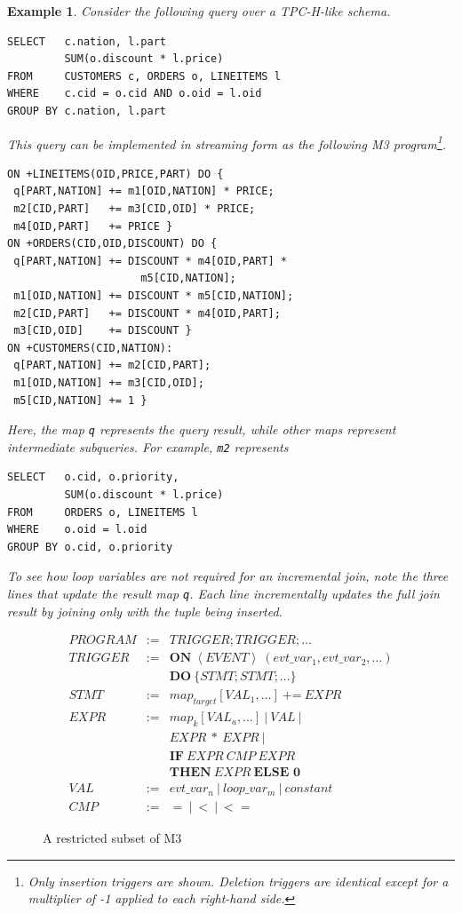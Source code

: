 \documentclass{vldb}
\newtheorem{example}[theorem]{Example}
\begin{document}
\begin{example}
Consider the following query over a TPC-H-like schema.
\begin{verbatim}
SELECT   c.nation, l.part
         SUM(o.discount * l.price)
FROM     CUSTOMERS c, ORDERS o, LINEITEMS l
WHERE    c.cid = o.cid AND o.oid = l.oid
GROUP BY c.nation, l.part
\end{verbatim}

This query can be implemented in streaming form as the following M3 program\footnote{Only insertion triggers are shown.  Deletion triggers are identical except for a multiplier of -1 applied to each right-hand side.}.
\begin{verbatim}
ON +LINEITEMS(OID,PRICE,PART) DO {
 q[PART,NATION] += m1[OID,NATION] * PRICE;
 m2[CID,PART]   += m3[CID,OID] * PRICE;
 m4[OID,PART]   += PRICE }
ON +ORDERS(CID,OID,DISCOUNT) DO {
 q[PART,NATION] += DISCOUNT * m4[OID,PART] * 
                     m5[CID,NATION];
 m1[OID,NATION] += DISCOUNT * m5[CID,NATION];
 m2[CID,PART]   += DISCOUNT * m4[OID,PART];
 m3[CID,OID]    += DISCOUNT }
ON +CUSTOMERS(CID,NATION): 
 q[PART,NATION] += m2[CID,PART];
 m1[OID,NATION] += m3[CID,OID];
 m5[CID,NATION] += 1 }
\end{verbatim}
Here, the map \texttt{q} represents the query result, while other maps represent intermediate subqueries.  For example, \texttt{m2} represents 
\begin{verbatim}
SELECT   o.cid, o.priority, 
         SUM(o.discount * l.price) 
FROM     ORDERS o, LINEITEMS l
WHERE    o.oid = l.oid
GROUP BY o.cid, o.priority
\end{verbatim}
To see how loop variables are not required for an incremental join, note the three lines that update the result map \texttt{q}.  Each line incrementally updates the full join result by joining only with the tuple being inserted.
\end{example}

\begin{figure}
\begin{center}
{\small
\begin{eqnarray*}
PROGRAM & := & TRIGGER; TRIGGER; \ldots\\
TRIGGER & := & \textbf{ON}\ \left <EVENT\right>\ ( evt\_var_1, evt\_var_2, \ldots )\\ & & \textbf{DO}\ \{ STMT; STMT; \ldots\}\\
STMT & := & map_{target}[VAL_{1}, \ldots]\ \textbf{+=}\ EXPR\\
EXPR & := & map_{k}[VAL_{a}, \ldots]\ |\ VAL\ |\\&& EXPR\ *\ EXPR\ |\\&& \textbf{IF}\ EXPR\ CMP\ EXPR\\&& \textbf{THEN}\ EXPR\ \textbf{ELSE 0}\\
VAL & := & evt\_var_{n}\ |\ loop\_var_{m}\ |\ constant\\
CMP & := & =\ |\ <\ |\ <=
\end{eqnarray*}}
\caption{A restricted subset of M3}
\label{fig:m3_defn}
\end{center}
\end{figure}
\end{document}
